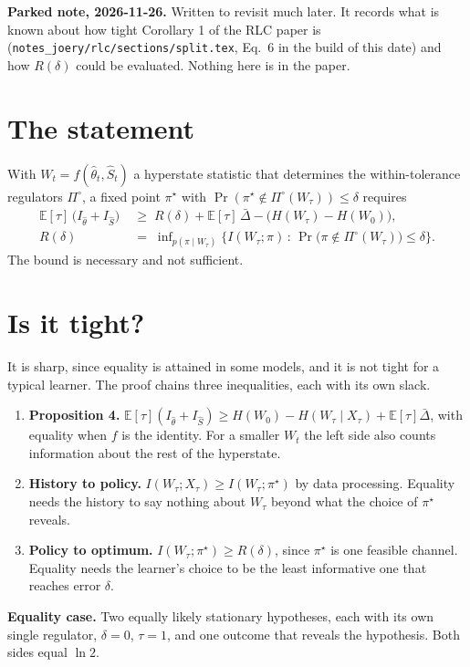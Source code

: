 \documentclass[10pt]{article}
\newcommand{\E}{\mathbb E}
\begin{document}
\noindent\textbf{Parked note, 2026-11-26.}
Written to revisit much later.
It records what is known about how tight Corollary 1 of the RLC paper is (\texttt{notes\_joery/rlc/sections/split.tex}, Eq.~6 in the build of this date) and how $R(\delta)$ could be evaluated.
Nothing here is in the paper.

\section{The statement}
With $W_t = f(\hat\theta_t, \hat S_t)$ a hyperstate statistic that determines the within-tolerance regulators $\Pi^\circ$, a fixed point $\pi^\star$ with $\Pr(\pi^\star \notin \Pi^\circ(W_\tau)) \le \delta$ requires
\begin{align*}
  \E[\tau]\, \big(I_{\hat\theta} + I_{\hat S}\big) \;&\ge\; R(\delta) + \E[\tau]\, \bar\Delta - \big(H(W_\tau) - H(W_0)\big), \\
  R(\delta) \;&=\; \inf\nolimits_{p(\pi \mid W_\tau)} \big\{ I(W_\tau; \pi) \,:\, \Pr\big(\pi \notin \Pi^\circ(W_\tau)\big) \le \delta \big\}.
\end{align*}
The bound is necessary and not sufficient.

\section{Is it tight?}
It is sharp, since equality is attained in some models, and it is not tight for a typical learner.
The proof chains three inequalities, each with its own slack.
\begin{enumerate}
  \item \textbf{Proposition 4.}
  $\E[\tau](I_{\hat\theta} + I_{\hat S}) \ge H(W_0) - H(W_\tau \mid X_\tau) + \E[\tau]\bar\Delta$, with equality when $f$ is the identity.
  For a smaller $W_t$ the left side also counts information about the rest of the hyperstate.
  \item \textbf{History to policy.}
  $I(W_\tau; X_\tau) \ge I(W_\tau; \pi^\star)$ by data processing.
  Equality needs the history to say nothing about $W_\tau$ beyond what the choice of $\pi^\star$ reveals.
  \item \textbf{Policy to optimum.}
  $I(W_\tau; \pi^\star) \ge R(\delta)$, since $\pi^\star$ is one feasible channel.
  Equality needs the learner's choice to be the least informative one that reaches error $\delta$.
\end{enumerate}
\textbf{Equality case.}
Two equally likely stationary hypotheses, each with its own single regulator, $\delta = 0$, $\tau = 1$, and one outcome that reveals the hypothesis.
Both sides equal $\ln 2$.
\end{document}
